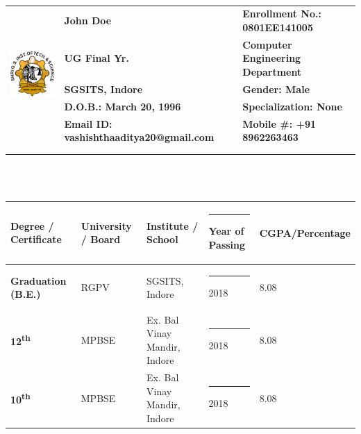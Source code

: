 \documentclass[a4paper,10pt]{article}
\begin{document}
\hspace{0.5cm}\\[-0.2cm]


\begin{tabular}{  m{10em} m{20em} m{20em}  }
		\multirow{5}{14em}{	\includegraphics[scale=0.40]{CollegeLogo}	}
		& \textbf{John Doe} & \textbf{Enrollment No.: 0801EE141005} \\
		& \textbf{UG Final Yr.} & \textbf{Computer Engineering Department} \\
		& \textbf{SGSITS, Indore} & \textbf{Gender: Male}  \\
		& \textbf{D.O.B.: March 20, 1996} & \textbf{Specialization: None} \\
		& \textbf{Email ID: vashishthaaditya20@gmail.com  } & \textbf{ Mobile \#: +91 8962263463 } \\
		\\
		\\
		\hline
\end{tabular} \\ \\
	\renewcommand{\arraystretch}{1.5}
	\newcommand{\LSpace}{ \rule{2em}{0em} }
\indent

\begin{tabular}{ m{10em} m{10em} m{10em} m{10em} m{10em}  }
\hline
	\textbf{Degree / Certificate} & \textbf{University / Board} & \textbf{Institute / School}   & \LSpace \textbf{Year of Passing} & \textbf{CGPA/Percentage} \\ [0.25ex]
\hline
\textbf{Graduation (B.E.)} & RGPV & SGSITS, Indore & \LSpace 2018 & 8.08 \\ [0.25ex]
\hline
\textbf{  12\textsuperscript{th} } & MPBSE & Ex. Bal Vinay Mandir, Indore  & \LSpace 2018 & 8.08 \\ [0.25ex]
\hline
\textbf{ 10\textsuperscript{th} } & MPBSE & Ex. Bal Vinay Mandir, Indore & \LSpace 2018 & 8.08 \\ [0.25ex]
\hline
\end{tabular}
\\ \\
\end{document}
